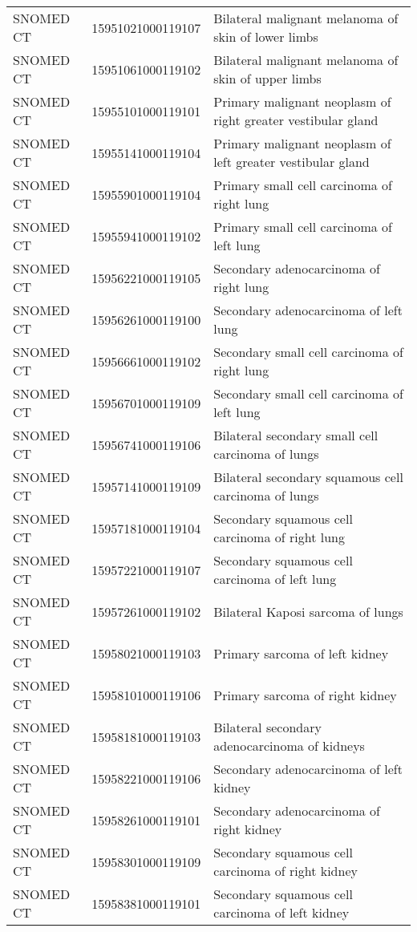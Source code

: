 \begin{longtable}{p{}p{}p{}}
  SNOMED CT & 15951021000119107 & Bilateral malignant melanoma of skin of lower limbs \\ 
  SNOMED CT & 15951061000119102 & Bilateral malignant melanoma of skin of upper limbs \\ 
  SNOMED CT & 15955101000119101 & Primary malignant neoplasm of right greater vestibular gland \\ 
  SNOMED CT & 15955141000119104 & Primary malignant neoplasm of left greater vestibular gland \\ 
  SNOMED CT & 15955901000119104 & Primary small cell carcinoma of right lung \\ 
  SNOMED CT & 15955941000119102 & Primary small cell carcinoma of left lung \\ 
  SNOMED CT & 15956221000119105 & Secondary adenocarcinoma of right lung \\ 
  SNOMED CT & 15956261000119100 & Secondary adenocarcinoma of left lung \\ 
  SNOMED CT & 15956661000119102 & Secondary small cell carcinoma of right lung \\ 
  SNOMED CT & 15956701000119109 & Secondary small cell carcinoma of left lung \\ 
  SNOMED CT & 15956741000119106 & Bilateral secondary small cell carcinoma of lungs \\ 
  SNOMED CT & 15957141000119109 & Bilateral secondary squamous cell carcinoma of lungs \\ 
  SNOMED CT & 15957181000119104 & Secondary squamous cell carcinoma of right lung \\ 
  SNOMED CT & 15957221000119107 & Secondary squamous cell carcinoma of left lung \\ 
  SNOMED CT & 15957261000119102 & Bilateral Kaposi sarcoma of lungs \\ 
  SNOMED CT & 15958021000119103 & Primary sarcoma of left kidney \\ 
  SNOMED CT & 15958101000119106 & Primary sarcoma of right kidney \\ 
  SNOMED CT & 15958181000119103 & Bilateral secondary adenocarcinoma of kidneys \\ 
  SNOMED CT & 15958221000119106 & Secondary adenocarcinoma of left kidney \\ 
  SNOMED CT & 15958261000119101 & Secondary adenocarcinoma of right kidney \\ 
  SNOMED CT & 15958301000119109 & Secondary squamous cell carcinoma of right kidney \\ 
  SNOMED CT & 15958381000119101 & Secondary squamous cell carcinoma of left kidney \\ 

\end{longtable}
